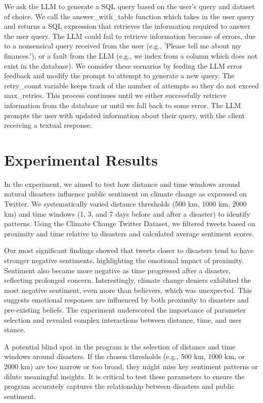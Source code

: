\documentclass{ieeeaccess}
\begin{document}
We ask the LLM to generate a SQL query based on the user's query and dataset of choice. We call the answer\_with\_table function which takes in the user query and returns a SQL expression that retrieves the information required to answer the user query. The LLM could fail to retrieve information because of errors, due to a nonsensical query received from the user (e.g., 'Please tell me about my finances.'), or a fault from the LLM (e.g., we index from a column which does not exist in the database). We consider these scenarios by feeding the LLM error feedback and modify the prompt to attempt to generate a new query. The retry\_count variable keeps track of the number of attempts so they do not exceed max\_retries. This process continues until we either successfully retrieve information from the database or until we fall back to some error. The LLM prompts the user with updated information about their query, with the client receiving a textual response.

\section{Experimental Results}
\label{sec:experimental_results}

In the experiment, we aimed to test how distance and time windows around natural disasters influence public sentiment on climate change as expressed on Twitter. We systematically varied distance thresholds (500 km, 1000 km, 2000 km) and time windows (1, 3, and 7 days before and after a disaster) to identify patterns. Using the Climate Change Twitter Dataset, we filtered tweets based on proximity and time relative to disasters and calculated average sentiment scores.

Our most significant findings showed that tweets closer to disasters tend to have stronger negative sentiments, highlighting the emotional impact of proximity. Sentiment also became more negative as time progressed after a disaster, reflecting prolonged concern. Interestingly, climate change deniers exhibited the most negative sentiment, even more than believers, which was unexpected. This suggests emotional responses are influenced by both proximity to disasters and pre-existing beliefs. The experiment underscored the importance of parameter selection and revealed complex interactions between distance, time, and user stance.

A potential blind spot in the program is the selection of distance and time windows around disasters. If the chosen thresholds (e.g., 500 km, 1000 km, or 2000 km) are too narrow or too broad, they might miss key sentiment patterns or dilute meaningful insights. It is critical to test these parameters to ensure the program accurately captures the relationship between disasters and public sentiment.
\end{document}
